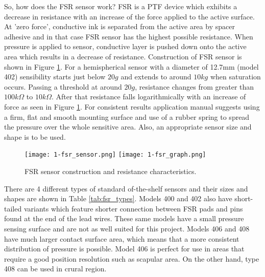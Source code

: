 So, how does the \ac{FSR} sensor work? \ac{FSR} is a \ac{PTF} device which exhibits a decrease in resistance with an increase of the force applied to the active surface\cite{fsr_guide}. At 'zero force', conductive ink is separated from the active area by spacer adhesive and in that case \ac{FSR} sensor has the highest possible resistance. When pressure is applied to sensor, conductive layer is pushed down onto the active area which results in a decrease of resistance. Construction of FSR sensor is shown in Figure \ref{fig:fsr-sensor}. For a hemispherical sensor with a diameter of 12.7mm (model 402) sensibility starts just below $20 g$ and extends to around $10 kg$ when saturation occurs. Passing a threshold at around $20 g$, resistance changes from greater than $100 k\Omega$ to $10 k\Omega$. After that resistance falls logarithmically with an increase of force as seen in Figure \ref{fig:fsr-sensor}. For consistent results application manual\cite{fsr_guide} suggests using a firm, flat and smooth mounting surface and use of a rubber spring to spread the pressure over the whole sensitive area. Also, an appropriate sensor size and shape is to be used.

\begin{figure}[h]
  \begin{center}
    \texttt{[image: 1-fsr\_sensor.png]}
    \texttt{[image: 1-fsr\_graph.png]}
  \end{center}
  \caption{FSR sensor construction and resistance characteristics.}
  \label{fig:fsr-sensor}
\end{figure}

There are 4 different types of standard of-the-shelf sensors\cite{fsr_guide} and their sizes and shapes are shown in Table \ref{tab:fsr_types}. Models 400 and 402 also have short-tailed variants which feature shorter connection between \ac{FSR} pads and pins found at the end of the lead wires. These same models have a small pressure sensing surface and are not as well suited for this project. Models 406 and 408 have much larger contact surface area, which means that a more consistent distribution of pressure is possible. Model 406 is perfect for use in areas that require a good position resolution such as scapular area. On the other hand, type 408 can be used in crural region.

